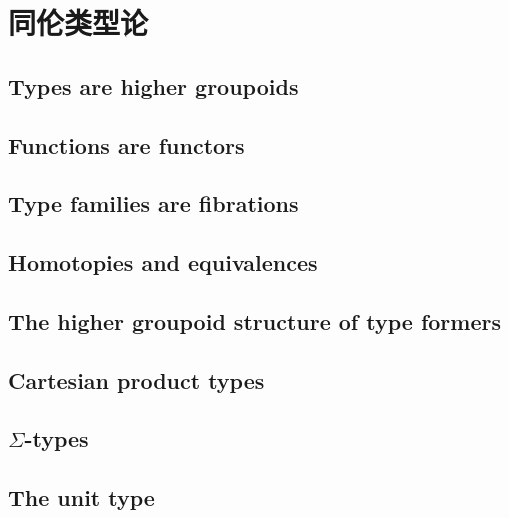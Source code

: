 \chapter{同伦类型论}
\label{cha:basics}


\section{Types are higher groupoids}
\label{sec:equality}


\section{Functions are functors}
\label{sec:functors}


\section{Type families are fibrations}
\label{sec:fibrations}


\section{Homotopies and equivalences}
\label{sec:basics-equivalences}


\section{The higher groupoid structure of type formers}
\label{sec:computational}


\section{Cartesian product types}
\label{sec:compute-cartprod}


\section{\texorpdfstring{$\Sigma$}{Σ}-types}
\label{sec:compute-sigma}


\section{The unit type}
\label{sec:compute-unit}


